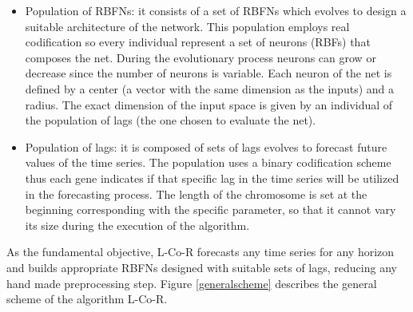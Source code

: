 \documentclass[a4paper,twoside]{article}
\newcommand{\metodo}{L-Co-R}
\begin{document}
\begin{itemize}
  \item Population of RBFNs: it consists of a set of RBFNs which evolves to design a suitable architecture of the network. This population employs real codification so every individual represent a set of neurons (RBFs) that composes the net. During the evolutionary process neurons can grow or decrease since the number of neurons is variable. Each neuron of the net is defined by a center (a vector with the same dimension as the inputs) and a radius. The exact dimension of the input space is given by an individual of the population of lags (the one chosen to evaluate the net).

  \item Population of lags: it is composed of sets of lags evolves to forecast future values of the time series. The population uses a binary codification scheme thus each gene indicates if that specific lag in the time series will be utilized in the forecasting process. The length of the chromosome is set at the beginning corresponding with the specific parameter, so that it cannot vary its size during the execution of the algorithm.
\end{itemize}


As the fundamental objective, {\metodo} forecasts any time series for any horizon and builds appropriate RBFNs designed with suitable sets of lags, reducing any hand made preprocessing step. Figure \ref{generalscheme} describes the general scheme of the algorithm {\metodo}.
\end{document}
